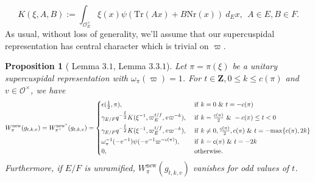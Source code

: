 \documentclass{amsart}
\theoremstyle{plain}
\newtheorem{prop}[thm]{Proposition}
\theoremstyle{plain}
\theoremstyle{remark}
\begin{document}
 $$K(\xi,A,B):=\int_{\mathcal{O}_E^\times}\xi(x)\psi(\mathrm{Tr}(Ax)+B\mathrm{Nr}(x))\ d_Ex,\ \ A\in E,B\in F.$$ As usual, without loss of generality, we'll assume that our supercuspidal representation has central character which is trivial on $\varpi$. 
\begin{prop}[\cite{Assing_2018} Lemma $3.1$, \cite{Assing_2019} Lemma $3.3.1$]\label{prop new vector supercuspidal}
    Let $\pi=\pi(\xi)$ be a unitary supercuspidal representation with $\omega_{\pi}(\varpi)=1$. For $t\in\mathbf{Z},  0\leq k \leq c(\pi)$ and $v\in\mathcal{O}^\times$, we have
    \begin{align*}
        W_{\pi}^\mathrm{new}(g_{t,k,v})=W_{\pi^\vee}^{\mathrm{new}^*}(g_{t,k,v})=\begin{dcases}
            \epsilon(\tfrac{1}{2},\pi),\ &\mathrm{if}\ k=0\ \&\ t=-c(\pi)\\
            \gamma_{E/F}q^{-\tfrac{t}{2}}K(\xi^{-1},\varpi_E^{t/f},v\varpi^{-k}),\ &\mathrm{if}\ k=\tfrac{c(\pi)}{2}\ \& \ -c(\pi)\leq t<0\\
            \gamma_{E/F}q^{-\tfrac{t}{2}}K(\xi^{-1},\varpi_E^{t/f},v\varpi^{-k}),\ &\mathrm{if}\ k\neq 0,\tfrac{c(\pi)}{2},c(\pi)\ \&\ t={-\mathrm{max}\{c(\pi),2k\}}\\
            \omega_{\pi}^{-1}(-v^{-1})\psi(-v^{-1}\varpi^{-c(\pi)}),\ &\mathrm{if}\ k=c(\pi)\ \&\ t=-2k\\
            0,\ &\mathrm{otherwise.}
        \end{dcases}
    \end{align*}
    Furthermore, if $E/F$ is unramified, $ W_{\pi}^\mathrm{new}(g_{t,k,v})$ vanishes for odd values of $t$.
\end{prop}
\end{document}
